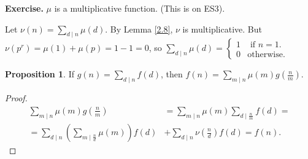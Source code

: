 \documentclass{article}
\theoremstyle{definition}
\newtheorem{prop}[theorem]{Proposition}
\begin{document}
\textbf{Exercise.} $\mu$ is a multiplicative function. (This is on ES3).
\vspace{1mm}

Let $\nu(n) = \sum_{d \mid n}^{} \mu(d)$. By Lemma \ref{2.8}, $\nu$ is multiplicative. But $\nu(p^r) = \mu(1)+\mu(p)= 1 - 1 = 0$, so $\sum_{d \mid n}^{} \mu(d) = \begin{cases}
    1 &\text{ if } n=1. \\
    0 &\text{otherwise.}
\end{cases}$
\begin{prop}
    If $g(n)=\sum_{d \mid n}^{} f(d)$, then $f(n)=\sum_{m \mid n}^{} \mu(m)g \left(\frac{n}{m}\right)$.
\end{prop}
\begin{proof}
    \begin{align*}
        \sum_{m \mid n}^{} \mu(m)g\left(\frac{n}{m}\right) &= \sum_{m \mid n}^{} \mu(m) \sum_{d \mid \frac{n}{m}}^{} f(d) = \\ 
        =\sum_{d \mid n}^{} \left( \sum_{m \mid \frac{n}{d}}^{} \mu(m)\right)f(d) &+ \sum_{d \mid n}^{} \nu\left(\frac{n}{d} \right)f(d) = f(n).
    \end{align*}
\end{proof}
\end{document}

